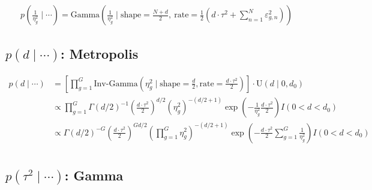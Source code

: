 \documentclass{article}\usepackage{graphicx, color}
\providecommand{\e}{\varepsilon}
\begin{document}
\begin{flushleft}
\begin{align*}
p \left ( \frac{1}{\eta_g^2} \mid \cdots \right ) = \text{Gamma} \left (\frac{1}{\eta_g^2} \mid \text{shape} = \frac{N + d}{2}, \  \text{rate} = \frac{1}{2} \left ( d \cdot \tau^2 + \sum_{n  =1}^N \e_{g, n}^2 \right ) \right )
\end{align*}

















\subsection{$p(d \mid \cdots)$: Metropolis}

\begin{align*}
p(d \mid \cdots) &= \left [ \prod_{g = 1}^G \text{Inv-Gamma} \left ( \eta_g^2 \mid \text{shape} = \frac{d}{2}, \text{rate} = \frac{d \cdot \tau^2}{2} \right ) \right ] \cdot \text{U}(d \mid 0, d_0) \\ 
& \propto \prod_{g = 1}^G  \Gamma \left( d/2 \right )^{-1} \left ( \frac{d \cdot \tau^2}{2}\right ) ^ {d  /2 } \left ( { \eta_g^2} \right )^{ -(d/2 + 1)} \exp \left (- \frac{1}{ \eta_g^2}\frac{d \cdot \tau^2}{2} \right ) I(0 < d < d_0) \\
& \propto \Gamma \left( d/2 \right )^{-G} \left ( \frac{d \cdot \tau^2}{2}\right ) ^ { G d  /2 } \left ( \prod_{g = 1}^G { \eta_g^2} \right )^{ -(d/2 + 1)} \exp \left (- \frac{d \cdot \tau^2}{2} \sum_{g = 1}^G \frac{1}{ \eta_g^2} \right ) I(0 < d < d_0) \\
\end{align*}










\subsection{$p(\tau^2 \mid \cdots)$: Gamma}


\end{flushleft}
\end{document}
